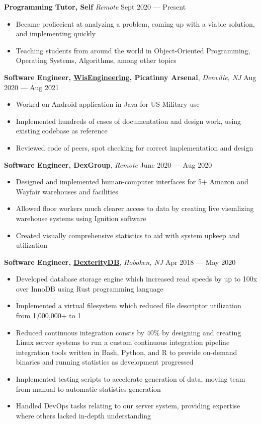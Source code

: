 \documentclass[10pt,letterpaper,roman]{moderncv}
\begin{document}
\hfill

\textbf{Programming Tutor, Self}
\textit{Remote} \hfill Sept 2020 --- Present
\begin{itemize}
\item Became profiecient at analyzing a problem, coming up with a viable solution, and implementing quickly
\item Teaching students from around the world in Object-Oriented Programming, Operating Systems, Algorithms, among other topics
\end{itemize}

\hfill

\textbf{Software Engineer, \href{https://wisengineering.com/}{WisEngineering}, Picatinny Arsenal},
\textit{Denville, NJ} \hfill Aug 2020 --- Aug 2021
\begin{itemize}
\item Worked on Android application in Java for US Military use
\item Implemented hundreds of cases of documentation and design work, using existing codebase as reference
\item Reviewed code of peers, spot checking for correct implementation and design
\end{itemize}

\hfill

\textbf{Software Engineer, DexGroup}, \textit{Remote} \hfill June 2020 --- Aug 2020
\begin{itemize}
\item Designed and implemented human-computer interfaces for 5+ Amazon and Wayfair warehouses
  and facilities
\item Allowed floor workers much clearer access to data by creating live
  visualizing warehouse systems using Ignition software
\item Created visually comprehensive statistics to aid with system upkeep and
  utilization
\end{itemize}

\hfill

\textbf{Software Engineer, \href{https://dexteritydb.com}{DexterityDB}},
\textit{Hoboken, NJ} \hfill Apr 2018 --- May 2020
\begin{itemize}
\item Developed database storage engine which increased read speeds by up to 100x over InnoDB using Rust programming language
\item Implemented a virtual filesystem which reduced file descriptor utilization
  from 1,000,000+ to 1
\item Reduced continuous integration consts by 40\% by designing and creating
  Linux server systems to run a custom continuous integration pipeline
  integration tools written in Bash, Python, and R to provide on-demand binaries
  and running statistics as development progressed
\item Implemented testing scripts to accelerate generation of data, moving team from manual to automatic statistics generation
\item Handled DevOps tasks relating to our server system, providing expertise
  where others lacked in-depth understanding
\end{itemize}
\end{document}
